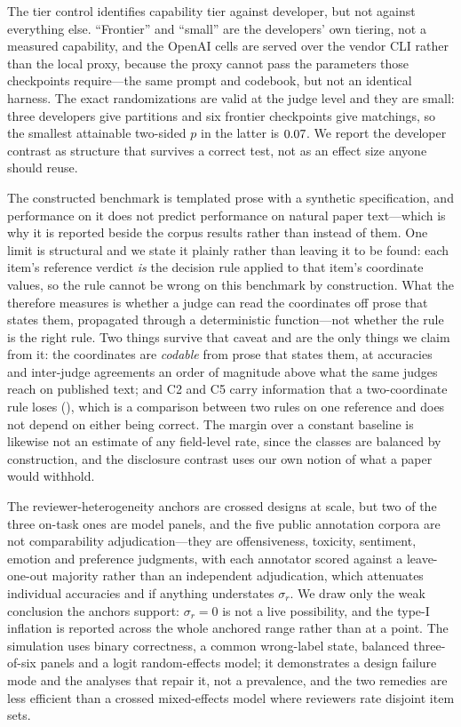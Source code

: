 \documentclass[11pt]{article}
\begin{document}
The tier control identifies capability tier against developer, but not against
everything else. ``Frontier'' and ``small'' are the developers' own tiering, not
a measured capability, and the OpenAI cells are served over the vendor CLI
rather than the local proxy, because the proxy cannot pass the parameters those
checkpoints require---the same prompt and codebook, but not an identical
harness. The exact randomizations are valid at the judge level and they are
small: three developers give \TierDevRand{} partitions and six frontier
checkpoints give \TierPairRand{} matchings, so the smallest attainable
two-sided $p$ in the latter is $0.07$. We report the developer contrast as
structure that survives a correct test, not as an effect size anyone should
reuse.

The constructed benchmark is templated prose with a synthetic specification, and
performance on it does not predict performance on natural paper text---which is
why it is reported beside the corpus results rather than instead of them. One
limit is structural and we state it plainly rather than leaving it to be found:
each item's reference verdict \emph{is} the decision rule applied to that item's
coordinate values, so the rule cannot be wrong on this benchmark by
construction. What the \InsRule{} therefore measures is whether a judge can read
the coordinates off prose that states them, propagated through a deterministic
function---not whether the rule is the right rule. Two things survive that
caveat and are the only things we claim from it: the coordinates are
\emph{codable} from prose that states them, at accuracies and inter-judge
agreements an order of magnitude above what the same judges reach on published
text; and C2 and C5 carry information that a two-coordinate rule loses
(\InsAblated{}), which is a comparison between two rules on one reference and
does not depend on either being correct. The margin over a constant baseline is
likewise not an estimate of any field-level rate, since the classes are balanced
by construction, and the disclosure contrast uses our own notion of what a paper
would withhold.

The reviewer-heterogeneity anchors are crossed designs at scale, but two of the
three on-task ones are model panels, and the five public annotation corpora are
not comparability adjudication---they are offensiveness, toxicity, sentiment,
emotion and preference judgments, with each annotator scored against a
leave-one-out majority rather than an independent adjudication, which attenuates
individual accuracies and if anything understates $\sigma_r$. We draw only the
weak conclusion the anchors support: $\sigma_r=0$ is not a live possibility, and
the type-I inflation is reported across the whole anchored range rather than at
a point. The simulation uses binary correctness, a common wrong-label state,
balanced three-of-six panels and a logit random-effects model; it demonstrates a
design failure mode and the analyses that repair it, not a prevalence, and the
two remedies are less efficient than a crossed mixed-effects model where
reviewers rate disjoint item sets.
\end{document}
